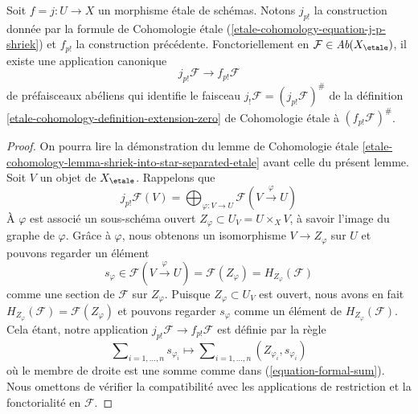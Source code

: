 \begin{lemma}
\label{lemma-finite-support-etale-shriek}
Soit $f = j : U \to X$ un morphisme étale de schémas. Notons $j_{p!}$
la construction donnée par la formule de Cohomologie étale
(\ref{etale-cohomology-equation-j-p-shriek})
et $f_{p!}$ la construction précédente. Fonctoriellement en
$\mathcal{F} \in \textit{Ab}(X_\etale)$, il existe une application canonique
$$
j_{p!}\mathcal{F} \longrightarrow f_{p!}\mathcal{F}
$$
de préfaisceaux abéliens qui identifie le faisceau
$j_!\mathcal{F} = (j_{p!}\mathcal{F})^\#$ de la définition
\ref{etale-cohomology-definition-extension-zero} de Cohomologie étale
à $(f_{p!}\mathcal{F})^\#$.
\end{lemma}

\begin{proof}
On pourra lire la démonstration du lemme de Cohomologie étale
\ref{etale-cohomology-lemma-shriek-into-star-separated-etale}
avant celle du présent lemme.
Soit $V$ un objet de $X_\etale$. Rappelons que
$$
j_{p!}\mathcal{F}(V) =
\bigoplus\nolimits_{\varphi : V \to U} \mathcal{F}(V \xrightarrow{\varphi} U)
$$
À $\varphi$ est associé un sous-schéma ouvert
$Z_\varphi \subset U_V = U \times_X V$, à savoir
l'image du graphe de $\varphi$. Grâce à $\varphi$,
nous obtenons un isomorphisme $V \to Z_\varphi$ sur $U$
et pouvons regarder un élément
$$
s_\varphi \in \mathcal{F}(V \xrightarrow{\varphi} U) =
\mathcal{F}(Z_\varphi) = H_{Z_\varphi}(\mathcal{F})
$$
comme une section de $\mathcal{F}$ sur $Z_{\varphi}$. Puisque
$Z_\varphi \subset U_V$ est ouvert, nous avons en fait
$H_{Z_\varphi}(\mathcal{F}) = \mathcal{F}(Z_\varphi)$
et pouvons regarder $s_\varphi$ comme un élément de $H_{Z_\varphi}(\mathcal{F})$.
Cela étant, notre application $j_{p!}\mathcal{F} \to f_{p!}\mathcal{F}$
est définie par la règle
$$
\sum\nolimits_{i = 1, \ldots, n} s_{\varphi_i}
\longmapsto
\sum\nolimits_{i = 1, \ldots, n} (Z_{\varphi_i}, s_{\varphi_i})
$$
où le membre de droite est une somme comme dans (\ref{equation-formal-sum}).
Nous omettons de vérifier la compatibilité avec les applications de restriction
et la fonctorialité en $\mathcal{F}$.


\end{proof}
